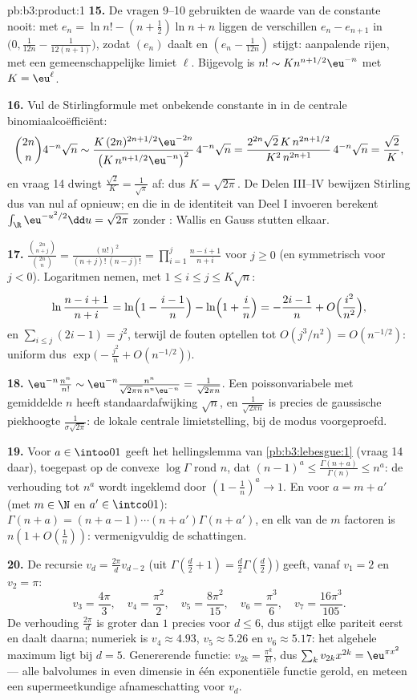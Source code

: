 \begin{solution}{pb:b3:product:1}
\textbf{15.} De vragen 9--10 gebruikten de waarde van de constante
nooit: met $e_n = \ln n! - (n+\frac12)\ln n + n$ liggen de
verschillen $e_n - e_{n+1}$ in $\bigl(0, \frac1{12n} -
\frac1{12(n+1)}\bigr)$, zodat $(e_n)$ daalt en $(e_n -
\frac1{12n})$ stijgt: aanpalende rijen, met een gemeenschappelijke
limiet $\ell$. Bijgevolg is $n! \sim K n^{n+1/2}\eu^{-n}$ met $K =
\eu^\ell$.

\textbf{16.} Vul de Stirlingformule met onbekende constante in in
de centrale binomiaalcoëfficiënt:
\[
\binom{2n}n4^{-n}\sqrt n \sim
\frac{K\,(2n)^{2n+1/2}\eu^{-2n}}{\bigl(K\,n^{n+1/2}
\eu^{-n}\bigr)^2}\,4^{-n}\sqrt n
= \frac{2^{2n}\sqrt{2}\,K\,n^{2n+1/2}}{K^2\,n^{2n+1}}
\,4^{-n}\sqrt n = \frac{\sqrt2}{K},
\]
en vraag 14 dwingt $\frac{\sqrt2}K = \frac1{\sqrt\pi}$ af: dus $K
= \sqrt{2\pi}$. De Delen III--IV bewijzen Stirling dus van nul af
opnieuw; en die in de identiteit van Deel I invoeren berekent
$\int_\R\eu^{-u^2/2}\dd u = \sqrt{2\pi}$ zonder :
Wallis en Gauss stutten elkaar.

\textbf{17.} $\frac{\binom{2n}{n+j}}{\binom{2n}n} =
\frac{(n!)^2}{(n+j)!\,(n-j)!} = \prod_{i=1}^{j}\frac{n-i+1}{n+i}$
voor $j \geq 0$ (en symmetrisch voor $j < 0$). Logaritmen nemen,
met $1 \leq i \leq j \leq K\sqrt n$:
\[
\ln\frac{n-i+1}{n+i} = \ln\Bigl(1 - \frac{i-1}n\Bigr) -
\ln\Bigl(1 + \frac in\Bigr) = -\frac{2i-1}{n} +
O\Bigl(\frac{i^2}{n^2}\Bigr),
\]
en $\sum_{i\leq j}(2i - 1) = j^2$, terwijl de fouten optellen tot
$O(j^3/n^2) = O(n^{-1/2})$: uniform dus $\exp\bigl(-\frac{j^2}n +
O(n^{-1/2})\bigr)$.

\textbf{18.} $\eu^{-n}\frac{n^n}{n!} \sim \eu^{-n}
\frac{n^n}{\sqrt{2\pi n}\,n^n\eu^{-n}} = \frac1{\sqrt{2\pi n}}$.
Een poissonvariabele met gemiddelde $n$ heeft
standaardafwijking $\sqrt n$, en $\frac1{\sqrt{2\pi n}}$ is
precies de gaussische piekhoogte $\frac1{\sigma\sqrt{2\pi}}$: de
lokale centrale limietstelling, bij de modus voorgeproefd.

\textbf{19.} Voor $a \in \intoo01$ geeft het hellingslemma van
\cref{pb:b3:lebesgue:1} (vraag 14 daar), toegepast op de convexe
$\log\Gamma$ rond $n$, dat $(n-1)^a \leq
\frac{\Gamma(n+a)}{\Gamma(n)} \leq n^a$: de verhouding tot $n^a$
wordt ingeklemd door $(1 - \frac1n)^a \to 1$. En voor $a = m + a'$
(met $m \in \N$ en $a' \in \intco01$): $\Gamma(n+a) = (n + a - 1)
\cdots(n + a')\Gamma(n + a')$, en elk van de $m$ factoren is $n(1
+ O(\frac1n))$: vermenigvuldig de schattingen.

\textbf{20.} De recursie $v_d = \frac{2\pi}dv_{d-2}$ (uit
$\Gamma(\frac d2 + 1) = \frac d2\Gamma(\frac d2)$) geeft, vanaf
$v_1 = 2$ en $v_2 = \pi$:
\[
v_3 = \frac{4\pi}3,\quad v_4 = \frac{\pi^2}2,\quad
v_5 = \frac{8\pi^2}{15},\quad v_6 = \frac{\pi^3}6,\quad
v_7 = \frac{16\pi^3}{105}.
\]
De verhouding $\frac{2\pi}d$ is groter dan $1$ precies voor $d
\leq 6$, dus stijgt elke pariteit eerst en daalt daarna; numeriek
is $v_4 \approx 4.93$, $v_5 \approx 5.26$ en $v_6 \approx 5.17$:
het algehele maximum ligt bij $d = 5$. Genererende functie:
$v_{2k} = \frac{\pi^k}{k!}$, dus $\sum_kv_{2k}x^{2k} = \eu^{\pi
x^2}$ --- alle balvolumes in even dimensie in één exponentiële
functie gerold, en meteen een supermeetkundige afnameschatting
voor $v_d$.


\end{solution}
